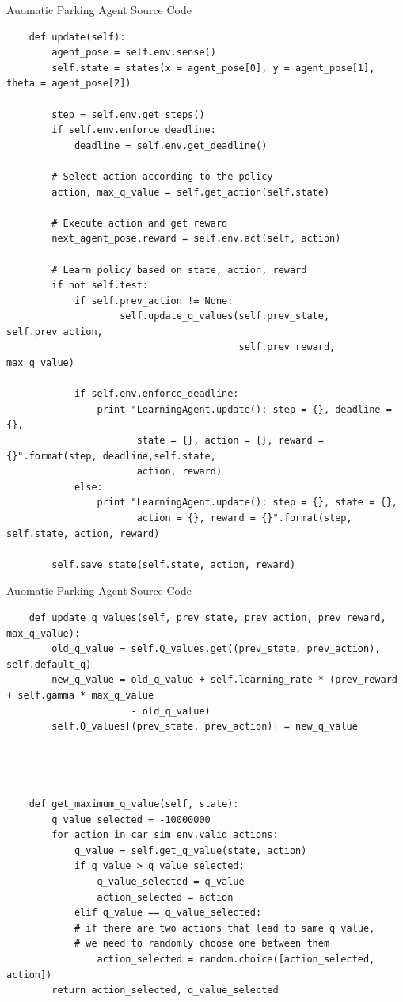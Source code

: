 \documentclass{beamer}
\begin{document}
\begin{frame}[fragile]{Auomatic Parking Agent Source Code}
\tiny{
\begin{verbatim}
    def update(self):
        agent_pose = self.env.sense()
        self.state = states(x = agent_pose[0], y = agent_pose[1], theta = agent_pose[2])

        step = self.env.get_steps()
        if self.env.enforce_deadline:
            deadline = self.env.get_deadline()

        # Select action according to the policy
        action, max_q_value = self.get_action(self.state)

        # Execute action and get reward
        next_agent_pose,reward = self.env.act(self, action)

        # Learn policy based on state, action, reward
        if not self.test:
            if self.prev_action != None:
                    self.update_q_values(self.prev_state, self.prev_action, 
                                         self.prev_reward, max_q_value)

            if self.env.enforce_deadline:
                print "LearningAgent.update(): step = {}, deadline = {},
                       state = {}, action = {}, reward = {}".format(step, deadline,self.state,
                       action, reward)
            else:
                print "LearningAgent.update(): step = {}, state = {}, 
                       action = {}, reward = {}".format(step, self.state, action, reward)

        self.save_state(self.state, action, reward)

\end{verbatim}
}
\end{frame}


\begin{frame}[fragile]{Auomatic Parking Agent Source Code}
\tiny{
\begin{verbatim}
    def update_q_values(self, prev_state, prev_action, prev_reward, max_q_value):
        old_q_value = self.Q_values.get((prev_state, prev_action), self.default_q)
        new_q_value = old_q_value + self.learning_rate * (prev_reward + self.gamma * max_q_value 
                      - old_q_value)
        self.Q_values[(prev_state, prev_action)] = new_q_value




    def get_maximum_q_value(self, state):
        q_value_selected = -10000000
        for action in car_sim_env.valid_actions:
            q_value = self.get_q_value(state, action)
            if q_value > q_value_selected:
                q_value_selected = q_value
                action_selected = action
            elif q_value == q_value_selected: 
            # if there are two actions that lead to same q value, 
            # we need to randomly choose one between them
                action_selected = random.choice([action_selected, action])
        return action_selected, q_value_selected
       

\end{verbatim}
}
\end{frame}
\end{document}

